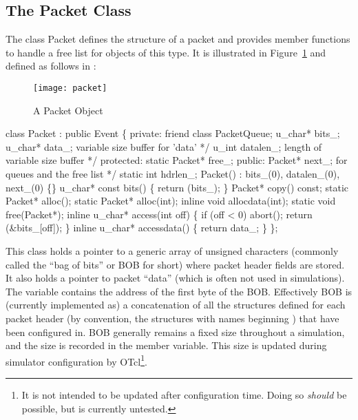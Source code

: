 \subsection{The Packet Class}
\label{sec:packetclass}

The class Packet defines the structure of a
packet and provides member functions to handle a
free list for objects of this type.
It is illustrated in Figure~\ref{pic:packet} and
defined as follows in :
\begin{figure}[ht]
  \centerline{\texttt{[image: packet]}}
  \caption{A Packet Object}
  \label{pic:packet}
\end{figure}
\begin{program}
        class Packet : public Event \{
        private:
                friend class PacketQueue;
                u_char* bits_;  
                u_char* data_;  \* variable size buffer for 'data' */
                u_int datalen_; \* length of variable size buffer */
        protected:
                static Packet* free_;
        public: 
                Packet* next_;  \* for queues and the free list */
                static int hdrlen_;
                Packet() : bits_(0), datalen_(0), next_(0) \{\}
                u_char* const bits() \{ return (bits_); \}
                Packet* copy() const;
                static Packet* alloc();
                static Packet* alloc(int);
                inline void allocdata(int);
                static void free(Packet*);
                inline u_char* access(int off) \{
                        if (off < 0)
                                abort();
                        return (&bits_[off]);
                \}  
                inline u_char* accessdata() \{ return data_; \}
        \};
\end{program}
This class holds a pointer to a generic array of unsigned
characters (commonly called the ``bag of bits'' or BOB for short)
where packet header fields are stored.
It also holds a pointer to packet ``data'' (which is often not used in
simulations).
The  variable contains the address of
the first byte of the BOB.
Effectively BOB is (currently implemented as) a concatenation
of all the structures defined for each packet header (by convention,
the structures with names beginning ) that have
been configured in.
BOB generally remains a fixed size throughout a simulation, and
the size is recorded in the  member
variable.
This size is updated during simulator configuration by
OTcl\footnote{It is not intended to be updated after configuration
time.  Doing so {\em should} be possible, but is currently untested.}.

